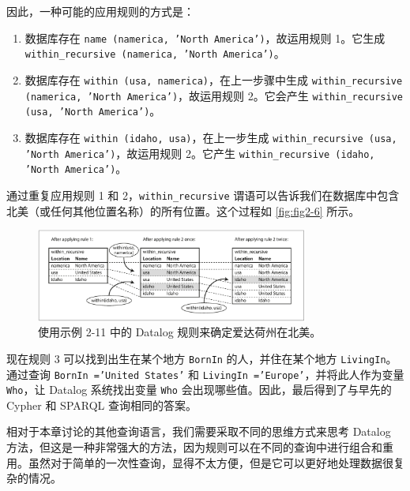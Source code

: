 因此，一种可能的应用规则的方式是：

\begin{enumerate}
    \item 数据库存在 \texttt{name (namerica, 'North America')}，故运用规则 1。它生成 \texttt{within\_recursive (namerica, 'North America')}。
    \item 数据库存在 \texttt{within (usa, namerica)}，在上一步骤中生成 \texttt{within\_recursive (namerica, 'North America')}，故运用规则 2。它会产生 \texttt{within\_recursive (usa, 'North America')}。
    \item 数据库存在 \texttt{within (idaho, usa)}，在上一步生成 \texttt{within\_recursive (usa, 'North America')}，故运用规则 2。它产生 \texttt{within\_recursive (idaho, 'North America')}。
\end{enumerate}


通过重复应用规则 1 和 2，\texttt{within\_recursive} 谓语可以告诉我们在数据库中包含北美（或任何其他位置名称）的所有位置。这个过程如 \autoref{fig:fig2-6} 所示。

\begin{figure}[hbtp]
    \includegraphics[width=0.8\textwidth]{img/fig2-6.png}
    \caption{使用示例 2-11 中的 Datalog 规则来确定爱达荷州在北美。}
    \label{fig:fig2-6}
\end{figure}

现在规则 3 可以找到出生在某个地方 \texttt{BornIn} 的人，并住在某个地方 \texttt{LivingIn}。通过查询 \texttt{BornIn ='United States'} 和 \texttt{LivingIn ='Europe'}，并将此人作为变量 \texttt{Who}，让 Datalog 系统找出变量 \texttt{Who} 会出现哪些值。因此，最后得到了与早先的 Cypher 和 SPARQL 查询相同的答案。

相对于本章讨论的其他查询语言，我们需要采取不同的思维方式来思考 Datalog 方法，但这是一种非常强大的方法，因为规则可以在不同的查询中进行组合和重用。虽然对于简单的一次性查询，显得不太方便，但是它可以更好地处理数据很复杂的情况。